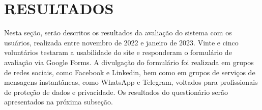 \documentclass[
	12pt,				%
	openright,			%
	oneside,			%
	a4paper,			%
	english,			%
	french,				%
	spanish,			%
	brazil,				%
	]{abntex2}
\begin{document}
\pagebreak


\chapter{RESULTADOS}
\label{ch: resultados} 

Nesta seção, serão descritos os resultados da avaliação do sistema com os usuários, realizada entre novembro de 2022 e janeiro de 2023. Vinte e cinco voluntários testaram a usabilidade do site e responderam o formulário de avaliação via Google Forms. A divulgação do formulário foi realizada em grupos de redes sociais, como Facebook e Linkedin, bem como em grupos de serviços de mensagens instantâneas, como WhatsApp e Telegram, voltados para profissionais de proteção de dados e privacidade. Os resultados do questionário serão apresentados na próxima subseção.
\end{document}
